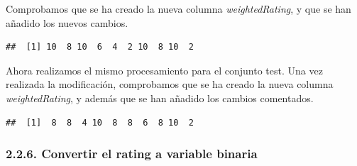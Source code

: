 \documentclass[spanish,]{article}
\newenvironment{Shaded}{\begin{snugshade}}{\end{snugshade}}
\newcommand{\KeywordTok}[1]{\textcolor[rgb]{0.13,0.29,0.53}{\textbf{#1}}}
\newcommand{\DecValTok}[1]{\textcolor[rgb]{0.00,0.00,0.81}{#1}}
\newcommand{\FloatTok}[1]{\textcolor[rgb]{0.00,0.00,0.81}{#1}}
\newcommand{\StringTok}[1]{\textcolor[rgb]{0.31,0.60,0.02}{#1}}
\newcommand{\CommentTok}[1]{\textcolor[rgb]{0.56,0.35,0.01}{\textit{#1}}}
\newcommand{\ControlFlowTok}[1]{\textcolor[rgb]{0.13,0.29,0.53}{\textbf{#1}}}
\newcommand{\OperatorTok}[1]{\textcolor[rgb]{0.81,0.36,0.00}{\textbf{#1}}}
\newcommand{\NormalTok}[1]{#1}
\begin{document}
\begin{Shaded}
\end{Shaded}

Comprobamos que se ha creado la nueva columna \emph{weightedRating}, y
que se han añadido los nuevos cambios.

\begin{Shaded}
\end{Shaded}

\begin{verbatim}
##  [1] 10  8 10  6  4  2 10  8 10  2
\end{verbatim}

Ahora realizamos el mismo procesamiento para el conjunto test. Una vez
realizada la modificación, comprobamos que se ha creado la nueva columna
\emph{weightedRating}, y además que se han añadido los cambios
comentados.

\begin{Shaded}
\end{Shaded}

\begin{verbatim}
##  [1]  8  8  4 10  8  8  6  8 10  2
\end{verbatim}

\subsubsection{2.2.6. Convertir el rating a variable
binaria}\label{convertir-el-rating-a-variable-binaria}
\end{document}
